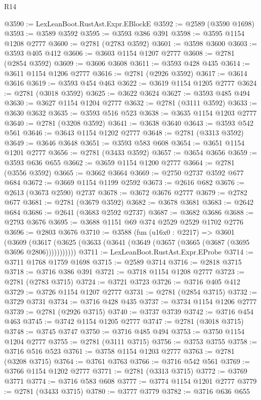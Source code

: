 \begin{lexlean}{R14}
\begin{coremodule}
@3590 := LexLeanBoot.RustAst.Expr.EBlockE
@3592 := @2589 (@3590 @1698)
@3593 := @3589 @3592
@3595 := @3593 @386 @391
@3598 := @3595 @1154 @1208 @2777
@3600 := @2781 (@2783 @3592)
@3601 := @3598 @3600
@3603 := @3593 @405 @412
@3606 := @3603 @1154 @1207 @2777
@3608 := @2781 (@2854 @3592)
@3609 := @3606 @3608
@3611 := @3593 @428 @435
@3614 := @3611 @1154 @1206 @2777
@3616 := @2781 (@2926 @3592)
@3617 := @3614 @3616
@3619 := @3593 @454 @463
@3622 := @3619 @1154 @1205 @2777
@3624 := @2781 (@3018 @3592)
@3625 := @3622 @3624
@3627 := @3593 @485 @494
@3630 := @3627 @1154 @1204 @2777
@3632 := @2781 (@3111 @3592)
@3633 := @3630 @3632
@3635 := @3593 @516 @523
@3638 := @3635 @1154 @1203 @2777
@3640 := @2781 (@3208 @3592)
@3641 := @3638 @3640
@3643 := @3593 @542 @561
@3646 := @3643 @1154 @1202 @2777
@3648 := @2781 (@3313 @3592)
@3649 := @3646 @3648
@3651 := @3593 @583 @608
@3654 := @3651 @1154 @1201 @2777
@3656 := @2781 (@3433 @3592)
@3657 := @3654 @3656
@3659 := @3593 @636 @655
@3662 := @3659 @1154 @1200 @2777
@3664 := @2781 (@3556 @3592)
@3665 := @3662 @3664
@3669 := @2750 @2737 @3592 @677 @684
@3672 := @3669 @1154 @1199 @2592
@3673 := @2616 @682
@3676 := @2613 (@3673 @2590) @2737
@3678 := @3672 @3676 @2777
@3679 := @2782 @677
@3681 := @2781 (@3679 @3592)
@3682 := @3678 @3681
@3683 := @2642 @684
@3686 := @2641 (@3683 @2592 @2737)
@3687 := @3682 @3686
@3688 := @2793 @3676
@3695 := @3688 @1151 @69 @374 @2529 @2529 @1702 @2776
@3696 := @2803 @3676
@3710 := @3588
    (fun (u16x0 : @2217) =>
    @3601
      (@3609 (@3617 (@3625 (@3633 (@3641 (@3649 (@3657 (@3665 (@3687 (@3695 @3696 @2806)))))))))))
@3711 := LexLeanBoot.RustAst.Expr.EProbe
@3714 := @3711 @1768 @1759 @1698
@3715 := @2589 @3714
@3716 := @2818 @3715
@3718 := @3716 @386 @391
@3721 := @3718 @1154 @1208 @2777
@3723 := @2781 (@2783 @3715)
@3724 := @3721 @3723
@3726 := @3716 @405 @412
@3729 := @3726 @1154 @1207 @2777
@3731 := @2781 (@2854 @3715)
@3732 := @3729 @3731
@3734 := @3716 @428 @435
@3737 := @3734 @1154 @1206 @2777
@3739 := @2781 (@2926 @3715)
@3740 := @3737 @3739
@3742 := @3716 @454 @463
@3745 := @3742 @1154 @1205 @2777
@3747 := @2781 (@3018 @3715)
@3748 := @3745 @3747
@3750 := @3716 @485 @494
@3753 := @3750 @1154 @1204 @2777
@3755 := @2781 (@3111 @3715)
@3756 := @3753 @3755
@3758 := @3716 @516 @523
@3761 := @3758 @1154 @1203 @2777
@3763 := @2781 (@3208 @3715)
@3764 := @3761 @3763
@3766 := @3716 @542 @561
@3769 := @3766 @1154 @1202 @2777
@3771 := @2781 (@3313 @3715)
@3772 := @3769 @3771
@3774 := @3716 @583 @608
@3777 := @3774 @1154 @1201 @2777
@3779 := @2781 (@3433 @3715)
@3780 := @3777 @3779
@3782 := @3716 @636 @655

\end{coremodule}
\end{lexlean}
